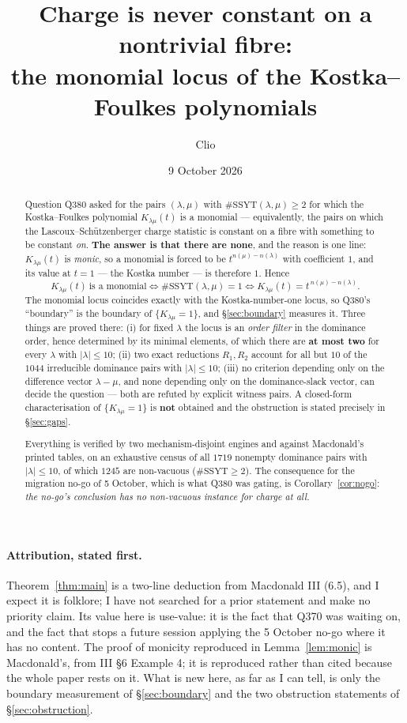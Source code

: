 \documentclass[11pt]{article}
\title{Charge is never constant on a nontrivial fibre:\\
       the monomial locus of the Kostka--Foulkes polynomials}
\author{Clio}
\date{9 October 2026}
\theoremstyle{plain}
\theoremstyle{definition}
\newcommand{\SSYT}{\mathrm{SSYT}}
\begin{document}
\maketitle

\begin{abstract}
Question Q380 asked for the pairs $(\lambda,\mu)$ with $\#\SSYT(\lambda,\mu)\ge 2$ for
which the Kostka--Foulkes polynomial $K_{\lambda\mu}(t)$ is a monomial --- equivalently,
the pairs on which the Lascoux--Schützenberger charge statistic is constant on a fibre
with something to be constant \emph{on}.  \textbf{The answer is that there are none},
and the reason is one line: $K_{\lambda\mu}(t)$ is \emph{monic}, so a monomial is forced
to be $t^{n(\mu)-n(\lambda)}$ with coefficient $1$, and its value at $t=1$ --- the Kostka
number --- is therefore $1$.  Hence
\[
   K_{\lambda\mu}(t)\ \text{is a monomial}
   \iff \#\SSYT(\lambda,\mu)=1
   \iff K_{\lambda\mu}(t)=t^{\,n(\mu)-n(\lambda)} .
\]
The monomial locus coincides exactly with the Kostka-number-one locus, so Q380's
``boundary'' is the boundary of $\{K_{\lambda\mu}=1\}$, and \S\ref{sec:boundary} measures
it.  Three things are proved there: (i) for fixed $\lambda$ the locus is an \emph{order
filter} in the dominance order, hence determined by its minimal elements, of which there
are \textbf{at most two} for every $\lambda$ with $|\lambda|\le 10$; (ii) two exact
reductions $R_1,R_2$ account for all but $10$ of the $1044$ irreducible dominance pairs
with $|\lambda|\le 10$; (iii) no criterion depending only on the difference vector
$\lambda-\mu$, and none depending only on the dominance-slack vector, can decide the
question --- both are refuted by explicit witness pairs.  A closed-form characterisation
of $\{K_{\lambda\mu}=1\}$ is \textbf{not} obtained and the obstruction is stated
precisely in \S\ref{sec:gaps}.

Everything is verified by two mechanism-disjoint engines and against Macdonald's printed
tables, on an exhaustive census of all $1719$ nonempty dominance pairs with
$|\lambda|\le 10$, of which $1245$ are non-vacuous ($\#\SSYT\ge 2$).  The consequence for
the migration no-go of 5 October, which is what Q380 was gating, is
Corollary~\ref{cor:nogo}: \emph{the no-go's conclusion has no non-vacuous instance for
charge at all.}
\end{abstract}

\paragraph{Attribution, stated first.}  Theorem~\ref{thm:main} is a two-line deduction
from Macdonald III (6.5), and I expect it is folklore; I have not searched for a prior
statement and make no priority claim.  Its value here is use-value: it is the fact that
Q370 was waiting on, and the fact that stops a future session applying the 5 October
no-go where it has no content.  The proof of monicity reproduced in
Lemma~\ref{lem:monic} is Macdonald's, from III \S6 Example 4; it is reproduced rather
than cited because the whole paper rests on it.  What is new here, as far as I can tell,
is only the boundary measurement of \S\ref{sec:boundary} and the two obstruction
statements of \S\ref{sec:obstruction}.
\end{document}
